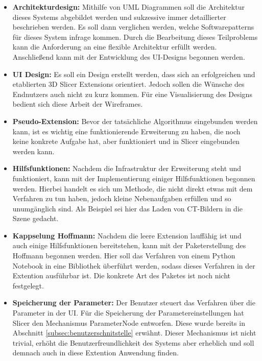 \begin{itemize}
	\item \textbf{Architekturdesign:} Mithilfe von UML Diagrammen soll die
		Architektur dieses Systems abgebildet werden und sukzessive immer
		detaillierter beschrieben werden. Es soll dann verglichen werden, welche
		Softwarepatterns für dieses System infrage kommen. Durch die Bearbeitung dieses
		Teilproblems kann die Anforderung an eine flexible Architektur erfüllt werden.
		Anschließend kann mit der Entwicklung des UI-Designs begonnen werden.

	\item \textbf{UI Design:} Es soll ein Design erstellt werden, dass sich an erfolgreichen
		und etablierten 3D Slicer Extensions orientiert. Jedoch sollen die Wünsche
		des Endnutzers auch nicht zu kurz kommen. Für eine Visualisierung des Designs
		bedient sich diese Arbeit der Wireframes.

	\item \textbf{Pseudo-Extension:} Bevor der tatsächliche Algorithmus
		eingebunden werden kann, ist es wichtig eine funktionierende Erweiterung zu haben,
		die noch keine konkrete Aufgabe hat, aber funktioniert und in Slicer eingebunden
		werden kann.

	\item \textbf{Hilfsfunktionen:} Nachdem die Infrastruktur der Erweiterung
		steht und funktioniert, kann mit der Implementierung einiger Hilfsfunktionen
		begonnen werden. Hierbei handelt es sich um Methode, die nicht direkt etwas mit
		dem Verfahren zu tun haben, jedoch kleine Nebenaufgaben erfüllen und so
		unumgänglich sind. Als Beispiel sei hier das Laden von CT-Bildern in die Szene
		gedacht.

	\item \textbf{Kappselung Hoffmann:} Nachdem die leere Extension lauffähig ist
		und auch einige Hilfsfunktionen bereitstehen, kann mit der Paketerstellung des
		Hoffmann begonnen werden. Hier soll das Verfahren von einem Python Notebook
		in eine Bibliothek überführt werden, sodass dieses Verfahren in der Extention
		ausführbar ist. Die konkrete Art des Paketes ist noch nicht festgelegt.

	\item \textbf{Speicherung der Parameter:} Der Benutzer steuert das Verfahren
		über die Parameter in der UI. Für die Speicherung der Parametereinstellungen
		hat Slicer den Mechanismus ParameterNode entworfen. Diese wurde bereits in
		Abschnitt \ref{subsec:benutzerschnitstelle} erwähnt. Dieser Mechanismus ist nicht
		trivial, erhöht die Benutzerfreundlichkeit des Systems aber erheblich und
		soll demnach auch in diese Extention Anwendung finden.


\end{itemize}
